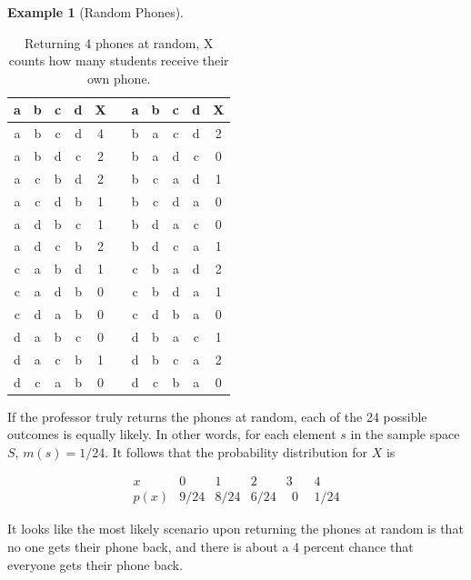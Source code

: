 \documentclass[
]{book}
\theoremstyle{definition}
\theoremstyle{definition}
\newtheorem{example}{Example}[chapter]
\theoremstyle{definition}
\theoremstyle{definition}
\theoremstyle{remark}
\begin{document}
\begin{example}[Random Phones]
\begin{table}
\centering
\caption{\label{tab:unnamed-chunk-5}Returning 4 phones at random, X counts how many students receive their own phone.}
\centering
\begin{tabular}[t]{|>{}c|c|c|>{}c||>{}c||>{}c||c|c|c|>{}c||>{}c|}
\hline
\textbf{a} & \textbf{b} & \textbf{c} & \textbf{d} & \textbf{X} & \textbf{ } & \textbf{a} & \textbf{b} & \textbf{c} & \textbf{d} & \textbf{X}\\
\hline
a & b & c & d & 4 &  & b & a & c & d & 2\\
\hline
a & b & d & c & 2 &  & b & a & d & c & 0\\
\hline
a & c & b & d & 2 &  & b & c & a & d & 1\\
\hline
a & c & d & b & 1 &  & b & c & d & a & 0\\
\hline
a & d & b & c & 1 &  & b & d & a & c & 0\\
\hline
a & d & c & b & 2 &  & b & d & c & a & 1\\
\hline
c & a & b & d & 1 &  & c & b & a & d & 2\\
\hline
c & a & d & b & 0 &  & c & b & d & a & 1\\
\hline
c & d & a & b & 0 &  & c & d & b & a & 0\\
\hline
d & a & b & c & 0 &  & d & b & a & c & 1\\
\hline
d & a & c & b & 1 &  & d & b & c & a & 2\\
\hline
d & c & a & b & 0 &  & d & c & b & a & 0\\
\hline
\end{tabular}
\end{table}

If the professor truly returns the phones at random, each of the 24 possible outcomes is equally likely. In other words, for each element \(s\) in the sample space \(S\), \(m(s) = 1/24\). It follows that the probability distribution for \(X\) is

\[
\begin{array}{c|c|c|c|c|c}
x & 0 & 1 & 2 & 3 & 4\\ \hline
p(x) & 9/24 & 8/24 & 6/24 & ~~0~~ & 1/24  
\end{array}
\]

It looks like the most likely scenario upon returning the phones at random is that no one gets their phone back, and there is about a 4 percent chance that everyone gets their phone back.

\end{example}
\end{document}
